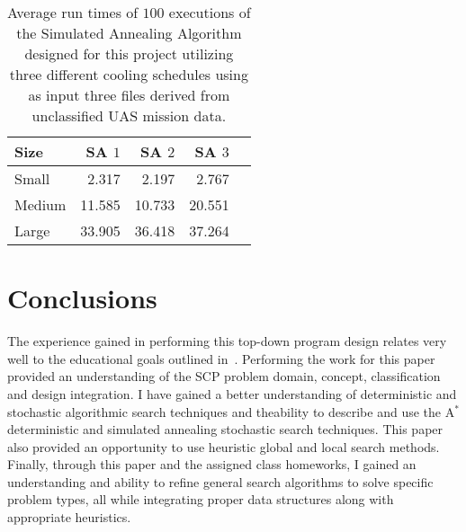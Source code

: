 \documentclass[conference]{IEEEtran}
\begin{document}
\begin{table}[ht!]
  \centering
  \caption{Average run times of $100$ executions of the Simulated Annealing
  Algorithm designed for this project utilizing three different cooling
  schedules using as input three files derived from unclassified UAS mission
  data.}
  \label{tab:SAResults}
  \begin{tabular}{ | l | r | r | r | r | }
  \hline
    Size     &  SA $1$  &  SA $2$  &   SA $3$ \\ \hline\hline
    Small    &   2.317  &   2.197  &    2.767 \\ \hline
    Medium   &  11.585  &  10.733  &   20.551 \\ \hline
    Large    &  33.905  &  36.418  &   37.264 \\ \hline
  \end{tabular}
\end{table}

\section{Conclusions} \label{sec:conclusion}


The experience gained in performing this top-down program design relates very
well to the educational goals outlined in~\cite{lamontSyllabus}. Performing the
work for this paper provided an understanding of the SCP problem domain,
concept, classification and design integration. I have gained a better
understanding of deterministic and stochastic algorithmic search techniques and
theability to describe and use the A$^*$ deterministic and simulated annealing
stochastic search techniques. This paper also provided an opportunity to use
heuristic global and local search methods. Finally, through this paper and the
assigned class homeworks, I gained an understanding and ability to refine
general search algorithms to solve specific problem types, all while
integrating proper data structures along with appropriate heuristics. 
\end{document}
